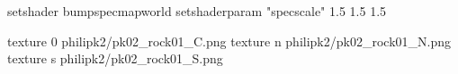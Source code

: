 setshader bumpspecmapworld
setshaderparam "specscale" 1.5 1.5 1.5

texture 0 philipk2/pk02_rock01_C.png
texture n philipk2/pk02_rock01_N.png
texture s philipk2/pk02_rock01_S.png

